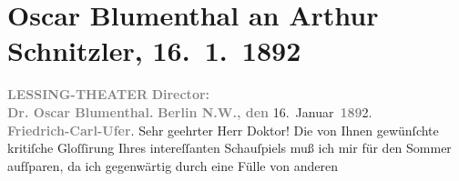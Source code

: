 

         
         \newcommand{\erwaehntePersonen}{Personen: Emanuel Reicher}
         \newcommand{\erwaehnteInstitutionen}{Institutionen: Emanuel Reicher’s Deutsche Gastspielgesellschaft, Lessing-Theater}
         \newcommand{\erwaehnteOrte}{Orte: Alexanderstraße, Berlin, Kapelle-Ufer, Wien}
         \newcommand{\erwaehnteWerke}{Werke: Das Märchen. Schauspiel in drei Aufzügen, Tagebuch}
               \section[Oscar Blumenthal an Arthur Schnitzler, 16. 1. 1892]{ Oscar Blumenthal an Arthur Schnitzler, 16. 1. 1892}\nopagebreak{}\rehead{ }\begin{ledgroupsized}[t]{13cm}\normalsize\beginnumbering \toendnotes[C]{\smallbreak\pagebreak[2]} 
\toendnotes[C]{\smallbreak}\pstart
           \noindent{}\centering{}{\pb}\textcolor{gray}{\textbf{LESSING-THEATER}}\pend
           \pstart
           \noindent{}\centering{}\textcolor{gray}{\textbf{Director:}}{\\}\textcolor{gray}{\textbf{Dr. Oscar Blumenthal.}}\pend
           \pstart
           \noindent{}\raggedleft{}\textcolor{gray}{\textbf{Berlin N.W., den}}{ }16. Januar \textcolor{gray}{\textbf{189}}2.{\\}\textcolor{gray}{\textbf{Friedrich-Carl-Ufer}}.\pend
           \pstart\center{}Sehr geehrter Herr Doktor!\pend\pstart
           Die von Ihnen gewünſchte kritiſche Gloſſirung Ihres intereſſanten Schauſpiels muß ich mir für den
                  Sommer aufſparen, da ich gegenwärtig durch eine Fülle von anderen

\end{ledgroupsized}
